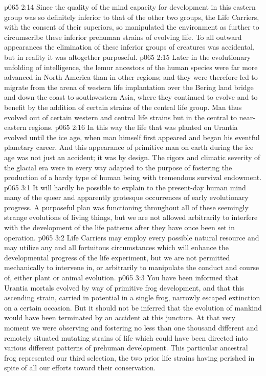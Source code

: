 \vs p065 2:14 Since the quality of the mind capacity for development in this eastern group was so definitely inferior to that of the other two groups, the Life Carriers, with the consent of their superiors, so manipulated the environment as further to circumscribe these inferior prehuman strains of evolving life. To all outward appearances the elimination of these inferior groups of creatures was accidental, but in reality it was altogether purposeful.
\vs p065 2:15 Later in the evolutionary unfolding of intelligence, the lemur ancestors of the human species were far more advanced in North America than in other regions; and they were therefore led to migrate from the arena of western life implantation over the Bering land bridge and down the coast to southwestern Asia, where they continued to evolve and to benefit by the addition of certain strains of the central life group. Man thus evolved out of certain western and central life strains but in the central to near\hyp{}eastern regions.
\vs p065 2:16 In this way the life that was planted on Urantia evolved until the ice age, when man himself first appeared and began his eventful planetary career. And this appearance of primitive man on earth during the ice age was not just an accident; it was by design. The rigors and climatic severity of the glacial era were in every way adapted to the purpose of fostering the production of a hardy type of human being with tremendous survival endowment.
\vs p065 3:1 It will hardly be possible to explain to the present\hyp{}day human mind many of the queer and apparently grotesque occurrences of early evolutionary progress. A purposeful plan was functioning throughout all of these seemingly strange evolutions of living things, but we are not allowed arbitrarily to interfere with the development of the life patterns after they have once been set in operation.
\vs p065 3:2 \pc Life Carriers may employ every possible natural resource and may utilize any and all fortuitous circumstances which will enhance the developmental progress of the life experiment, but we are not permitted mechanically to intervene in, or arbitrarily to manipulate the conduct and course of, either plant or animal evolution.
\vs p065 3:3 You have been informed that Urantia mortals evolved by way of primitive frog development, and that this ascending strain, carried in potential in a single frog, narrowly escaped extinction on a certain occasion. But it should not be inferred that the evolution of mankind would have been terminated by an accident at this juncture. At that very moment we were observing and fostering no less than one thousand different and remotely situated mutating strains of life which could have been directed into various different patterns of prehuman development. This particular ancestral frog represented our third selection, the two prior life strains having perished in spite of all our efforts toward their conservation.
